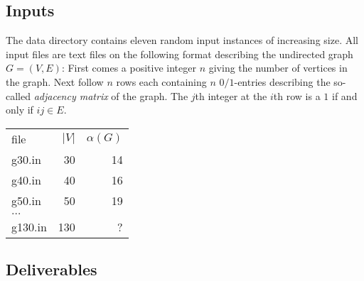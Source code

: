 \documentclass{tufte-handout}
\begin{document}
\subsection{Inputs}

The data directory contains eleven random input instances of
increasing size. 
All input files are text files on the following format describing the
undirected graph $G=(V,E)$: First comes a positive integer $n$ giving
the number of vertices in the graph.
Next follow $n$ rows each containing $n$ $0/1$-entries describing the
so-called \emph{adjacency matrix} of the graph.
The $j$th integer at the $i$th row is a $1$ if and only if $ij\in E$.

\begin{marginfigure}
\begin{tabular}{lrr}
file & $|V|$ & $\alpha(G)$\\
 g30.in & 30 & 14\\
 g40.in & 40 & 16\\
g50.in & 50&  19\\
$\ldots$\\
 g130.in& 130 &  ? 
\end{tabular}
\end{marginfigure}



\subsection{Deliverables}
\end{document}
